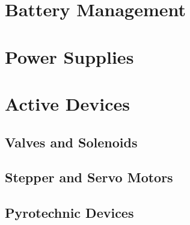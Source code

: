 \documentclass[12pt,article]{memoir}
\begin{document}
\chapter{Battery Management}

\newpage

\chapter{Power Supplies}

\newpage

\chapter{Active Devices}
\section{Valves and Solenoids}

\section{Stepper and Servo Motors}

\section{Pyrotechnic Devices}

\end{document}
